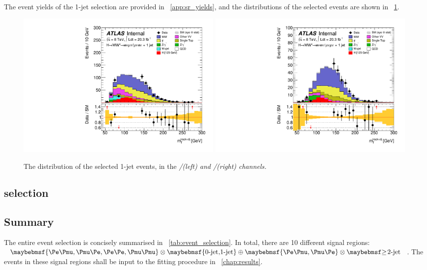 The event yields of the 1-jet selection are provided in \Appendix~\ref{app:sr_yields}, 
and the \mt distributions of the selected events are shown in \Figure~\ref{fig:sel:1j:mt}.

\begin{figure}
	\includegraphics[width=0.495\textwidth]{tex/selection/emme_CutFRecoil_1jet_MT_TrackHWW_Clj_mh125_lin}
	\hfill
	\includegraphics[width=0.495\textwidth]{tex/selection/eemm_CutFRecoil_1jet_MT_TrackHWW_Clj_mh125_lin}
	\caption{The \mt distribution of the selected 1-jet events, in the \em/\me (left) and 
	\ee/\mm (right) channels.}
	\label{fig:sel:1j:mt}
\end{figure}





\subsection{\twojet selection}
\label{sec:selection:2j}



\subsection{Summary}
\label{sec:selection:summary}

The entire event selection is concisely summarised in \Table~\ref{tab:event_selection}. 
In total, there are 10 different signal regions: $\braces{\em,\me,\ee,\mm} \otimes 
\braces{\text{0-jet,1-jet}} \oplus \braces{\em,\me} \otimes \twojet$. The events in these 
signal regions shall be input to the fitting procedure in \Chapter~\ref{chap:results}.

